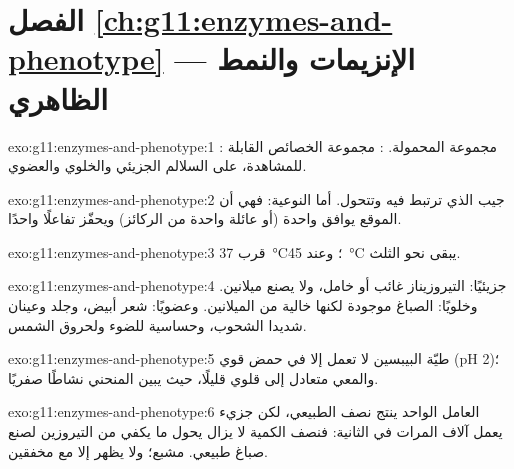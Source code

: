 \section*{الفصل \ref{ch:g11:enzymes-and-phenotype} --- الإنزيمات والنمط الظاهري}

\begin{solution}{exo:g11:enzymes-and-phenotype:1}
: مجموعة  المحمولة. : مجموعة
الخصائص القابلة للمشاهدة، على السلالم الجزيئي والخلوي والعضوي.
\end{solution}

\begin{solution}{exo:g11:enzymes-and-phenotype:2}
جيب  الذي ترتبط فيه  وتتحول. أما النوعية: فهي أن الموقع
يوافق  واحدة (أو عائلة واحدة من الركائز) ويحفّز تفاعلًا واحدًا.
\end{solution}

\begin{solution}{exo:g11:enzymes-and-phenotype:3}
قرب \qty{37}{\celsius}؛ وعند \qty{45}{\celsius} يبقى نحو الثلث.
\end{solution}

\begin{solution}{exo:g11:enzymes-and-phenotype:4}
جزيئيًا: التيروزيناز غائب أو خامل، ولا يصنع ميلانين. وخلويًا: 
الصباغ موجودة لكنها خالية من الميلانين. وعضويًا: شعر أبيض، وجلد
وعينان شديدا الشحوب، وحساسية للضوء ولحروق الشمس.
\end{solution}

\begin{solution}{exo:g11:enzymes-and-phenotype:5}
طيّة البيبسين لا تعمل إلا في حمض قوي (pH 2)؛ والمعي متعادل إلى قلوي
قليلًا، حيث يبين المنحني نشاطًا صفريًا.
\end{solution}

\begin{solution}{exo:g11:enzymes-and-phenotype:6}
 العامل الواحد ينتج نصف  الطبيعي، لكن جزيء  يعمل
آلاف المرات في الثانية: فنصف الكمية لا يزال يحول ما يكفي من التيروزين
لصنع صباغ طبيعي.  مشبع؛ ولا يظهر إلا مع  مخفقين.
\end{solution}

